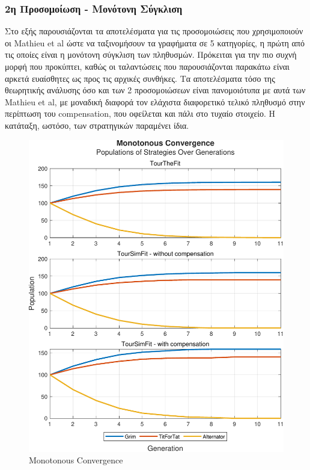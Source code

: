 \documentclass[12pt]{article}
\begin{document}
\subsubsection{2η Προσομοίωση - Μονότονη Σύγκλιση}
Στο εξής παρουσιάζονται τα αποτελέσματα για τις προσομοιώσεις που χρησιμοποιούν οι Mathieu et al ώστε να ταξινομήσουν τα γραφήματα σε 5 κατηγορίες, η πρώτη από τις οποίες είναι η μονότονη σύγκλιση των πληθυσμών. Πρόκειται για την πιο συχνή μορφή που προκύπτει, καθώς οι ταλαντώσεις που παρουσιάζονται παρακάτω είναι αρκετά ευαίσθητες ως προς τις αρχικές συνθήκες. Τα αποτελέσματα τόσο της θεωρητικής ανάλυσης όσο και των 2 προσομοιώσεων είναι πανομοιότυπα με αυτά των Mathieu et al, με μοναδική διαφορά τον ελάχιστα διαφορετικό τελικό πληθυσμό στην περίπτωση του compensation, που οφείλεται και πάλι στο τυχαίο στοιχείο. Η κατάταξη, ωστόσο, των στρατηγικών παραμένει ίδια.
	\begin{figure}[h]
	      \centering
	      \includegraphics[scale=0.8]{Monotonous Convergence.pdf}
	      \caption{Monotonous Convergence}
	\end{figure}
\end{document}
